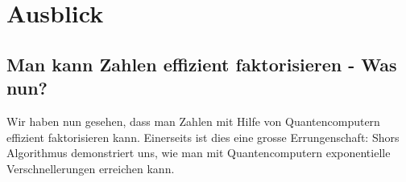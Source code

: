 \chapter{Ausblick}
\section{Man kann Zahlen effizient faktorisieren - Was nun?}
Wir haben nun gesehen, dass man Zahlen mit Hilfe von Quantencomputern effizient faktorisieren kann. Einerseits ist dies eine grosse Errungenschaft: Shors Algorithmus demonstriert uns, wie man mit Quantencomputern exponentielle Verschnellerungen erreichen kann. 